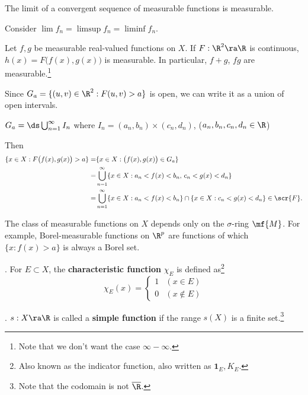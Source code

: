 \cor The limit of a convergent sequence of measurable functions is measurable.

\pf Consider \(\lim f_n = \limsup f_n = \liminf f_n\).

\pagebreak

 Let \(f, g\) be measurable real-valued functions on \(X\). If \(F: \R^2 \ra \R\) is continuous, \(h(x) = F\big(f(x), g(x)\big)\) is measurable. In particular, \(f + g\), \(fg\) are measurable.\footnote{Note that we don't want the case \(\infty - \infty\).}

\pf Since \(G_a = \{(u, v)\in \R^2 : F(u, v) > a\}\) is open, we can write it as a union of open intervals.
\begin{center}
    \(G_a = \ds \bigcup_{n=1}^{\infty} I_n\) where \(I_n = (a_n, b_n) \times (c_n, d_n)\), \quad (\(a_n, b_n, c_n, d_n\in \R\))
\end{center}
Then
\[
    \begin{aligned}
        \{x \in X : F\bigl(f(x), g(x)\bigr) > a\} = & \{x \in X : \bigl(f(x), g(x)\bigr) \in G_a\}                                                           \\
        =                                           & \bigcup_{n=1}^{\infty} \{x \in X : a_n < f(x) < b_n,\, c_n < g(x) < d_n\}                              \\
        =                                           & \bigcup_{n=1}^{\infty} \{x \in X : a_n < f(x) < b_n\} \cap \{x \in X : c_n < g(x) < d_n\} \in \scr{F}.
    \end{aligned}
\]

The class of measurable functions on \(X\) depends only on the \(\sigma\)-ring \(\mf{M}\). For example, Borel-measurable functions on \(\R^p\) are functions of which \(\{x : f(x) > a\}\) is always a Borel set.

.  For \(E \subset X\), the \textbf{characteristic function} \(\chi_E\) is defined as\footnote{Also known as the indicator function, also written as \(\mathbf{1}_E, K_E\).}\\
\[
    \chi_E(x) = \begin{cases}
        1 & (x\in E) \\ 0 & (x \notin E)
    \end{cases}
\]

.  \(s: X\ra\R\) is called a \textbf{simple function} if the range \(s(X)\) is a finite set.\footnote{Note that the codomain is not \(\overline{\R}\).}

